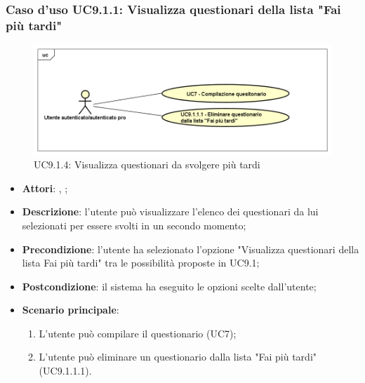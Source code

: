 			\subsubsection{Caso d'uso UC9.1.1: Visualizza questionari della lista "Fai più tardi"}
			\label{UC9.1.4}
			\begin{figure}[h]
				\centering
				\includegraphics[scale=0.5,keepaspectratio]{UML/UC9_1_1.png}
				\caption{UC9.1.4: Visualizza questionari da svolgere più tardi}
			\end{figure}
			\FloatBarrier
			\begin{itemize}
				\item \textbf{Attori}: \uau, \uaupro;
				\item \textbf{Descrizione}: l'utente può visualizzare l'elenco dei questionari da lui selezionati per essere svolti in un secondo momento;
				\item \textbf{Precondizione}: l'utente ha selezionato l'opzione "Visualizza questionari della lista Fai più tardi" tra le possibilità proposte in UC9.1;
				\item \textbf{Postcondizione}: il sistema ha eseguito le opzioni scelte dall'utente;
				\item \textbf{Scenario principale}: 
				\begin{enumerate}
					\item L'utente può compilare il questionario (UC7);
					\item L'utente può eliminare un questionario dalla lista "Fai più tardi" (UC9.1.1.1).
				\end{enumerate}
			\end{itemize}
				
